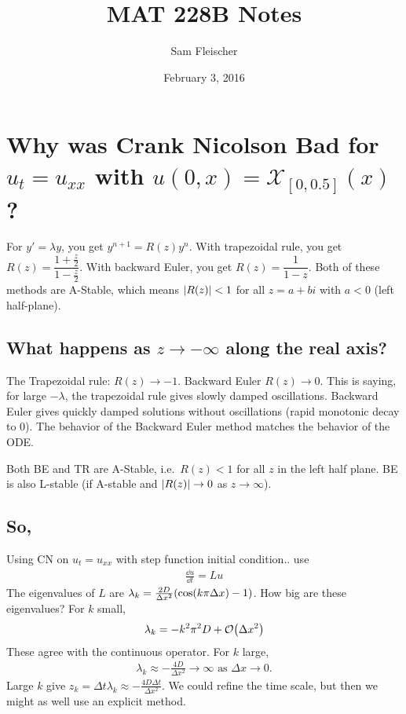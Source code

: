 \documentclass{article}
\title{MAT 228B Notes}
\author{Sam Fleischer}
\date{February 3, 2016}
\newcommand{\Dx}{\Delta x}
\newcommand{\Dt}{\Delta t}
\begin{document}
    \maketitle

    \section{Why was Crank Nicolson Bad for $u_t = u_{xx}$ with $u(0,x) = \mathcal{X}_{[0,0.5]}(x)$?}

        For $y' = \lambda y$, you get $y^{n+1} = R(z)y^n$.  With trapezoidal rule, you get $R(z) = \dfrac{1 + \frac{z}{2}}{1 - \frac{z}{2}}$.  With backward Euler, you get $R(z) = \dfrac{1}{1 - z}$.  Both of these methods are A-Stable, which means $\abs{R(z)} < 1$ for all $z = a + bi$ with $a < 0$ (left half-plane).

        \subsection{What happens as $z \rightarrow -\infty$ along the real axis?}

            The Trapezoidal rule: $R(z) \rightarrow -1$.  Backward Euler $R(z) \rightarrow 0$.  This is saying, for large $-\lambda$, the trapezoidal rule gives slowly damped oscillations.  Backward Euler gives quickly damped solutions without oscillations (rapid monotonic decay to $0$).  The behavior of the Backward Euler method matches the behavior of the ODE.

            Both BE and TR are A-Stable, i.e.~$R(z) < 1$ for all $z$ in the left half plane.  BE is also L-stable (if A-stable and $\abs{R(z)} \rightarrow 0$ as $z \rightarrow \infty$).

        \subsection{So,}

            Using CN on $u_t = u_{xx}$ with step function initial condition.. use
            \begin{align*}
                \frac{\dd u}{\dd t} = Lu
            \end{align*}
            The eigenvalues of $L$ are $\lambda_k = \frac{2D}{\Dx^2}\qty(\cos(k\pi\Dx) - 1)$.  How big are these eigenvalues?  For $k$ small, 
            \begin{align*}
                \lambda_k = -k^2\pi^2D + \order{\Dx^2}
            \end{align*}
            These agree with the continuous operator.  For $k$ large,
            \begin{align*}
                \lambda_k \approx -\frac{4D}{\Dx^2} \rightarrow \infty \text{ as } \Dx \rightarrow 0.
            \end{align*}
            Large $k$ give $z_k = \Dt \lambda_k \approx -\frac{4D\Dt}{\Dx^2}$.  We could refine the time scale, but then we might as well use an explicit method.
\end{document}

